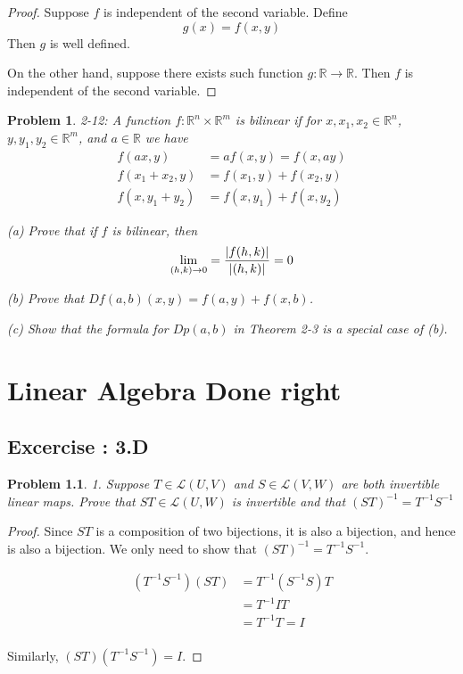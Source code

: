 \documentclass[12pt]{book}
\newtheorem*{problem*}{Problem}
\newcommand{\LL}{\mathcal{L}}
\begin{document}
\begin{proof}
  Suppose $f$ is independent of the second variable. Define
  \[
  g(x) = f(x, y) 
  \]
  Then $g$ is well defined.

  On the other hand, suppose there exists such function $g : \mathbb{R} \to \mathbb{R}$. Then $f$ is independent of the second variable. 
\end{proof}

\begin{problem*}
  2-12: A function $f : \mathbb{R}^n \times \mathbb{R}^m$ is bilinear if for $x, x_1, x_2 \in \mathbb{R}^n$, $y, y_1, y_2 \in \mathbb{R}^m$, and $a \in \mathbb{R}$ we have
    \begin{align*}
    f(ax, y) &= af(x,y) = f(x, ay)\\
    f(x_1 + x_2 , y) &= f(x_1, y) + f(x_2, y)\\
    f(x, y_1 + y_2) &= f(x, y_1) + f(x, y_2)
  \end{align*}

    (a) Prove that if $f$ is bilinear, then
    \[
    \lim_{(h,k) \to 0} = \frac{\abs{f(h,k)}}{\abs{(h,k)}} = 0
    \]

    (b) Prove that $Df(a,b)(x,y) = f(a,y) + f(x,b)$.

    (c) Show that the formula for $Dp(a,b)$ in Theorem 2-3 is a special case of (b). 
      
\end{problem*}



%

\chapter{Linear Algebra Done right}

\section{Excercise : 3.D}

\begin{problem*}
  1. Suppose $T \in \LL(U,V)$ and $ S \in \LL(V,W)$ are both invertible
  linear maps. Prove that $ST \in \LL(U,W)$ is invertible and that $(ST)^{-1} = T^{-1}S^{-1}$
\end{problem*}

\begin{proof}
  Since $ST$ is a composition of two bijections, it is also a bijection, and hence is also a bijection. We only need to show that $(ST)^{-1} = T^{-1}S^{-1}$.

  \begin{align*}
    (T^{-1} S^{-1}) (S T) & = T^{-1} (S^{-1} S) T\\
    & = T^{-1} I T\\
    & = T^{-1}T = I \\
  \end{align*}

  Similarly, $(S T) (T^{-1} S^{-1}) = I$.
\end{proof}
\end{document}
